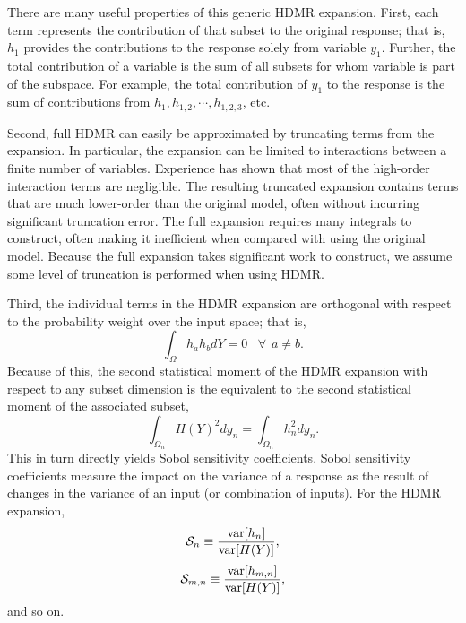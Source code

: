 There are many useful properties of this generic HDMR expansion.  First, each term represents the contribution
of that subset to the original response; that is, $h_1$ provides the contributions to the response solely
from variable $y_1$.  Further, the total contribution of a variable is the sum of all subsets for whom
variable is part of the subspace.  For example, the total contribution of $y_1$ to the response is the sum of
contributions from $h_1,h_{1,2},\cdots,h_{1,2,3}$, etc.

Second, full HDMR can easily be approximated by truncating terms from the expansion.  In particular, the
expansion can be limited to interactions between a finite number of variables.  Experience has shown
\cite{hdmrrabitz} that most of the high-order interaction terms are negligible.  The resulting truncated
expansion contains terms that are much lower-order than the original model, often without incurring
significant truncation error.  The full expansion requires many integrals to construct, often making it
inefficient when compared with using the original model.
Because the full expansion takes significant work to construct,
we assume some level of truncation is performed when using HDMR.

Third, the individual terms in the HDMR expansion are orthogonal with respect to the probability weight over
the input space; that is,
\begin{equation}
  \int_\Omega h_a h_b dY = 0 \hspace{10pt}\forall\hspace{5pt} a\neq b.
\end{equation}
Because of this, the second statistical moment of the HDMR expansion with respect to any subset dimension is
the equivalent to the second statistical moment of the associated subset,
\begin{equation}
  \int_{\Omega_n} H(Y)^2 dy_n = \int_{\Omega_n} h_n^2 dy_n.
\end{equation}
This in turn directly yields Sobol sensitivity coefficients.  Sobol sensitivity coefficients measure the impact on the
variance of a response as the result of changes in the variance of an input (or combination of inputs).  For
the HDMR expansion,
\begin{equation}
  \mathcal{S}_n \equiv \frac{\text{var}\qty[h_n]}{\text{var}\qty[H(Y)]},
\end{equation}
\begin{equation}
  \mathcal{S}_{m,n} \equiv \frac{\text{var}\qty[h_{m,n}]}{\text{var}\qty[H(Y)]},
\end{equation}
and so on.

